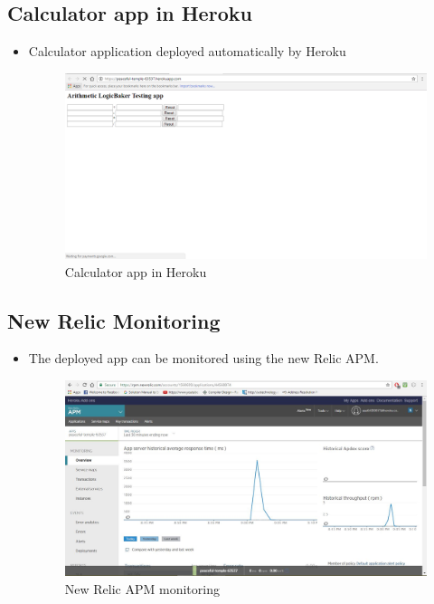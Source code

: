 \documentclass[12pt,a4paper,oneside]{report}
\begin{document}
{\subsection{Calculator app in Heroku}
\begin{itemize}
\item \par Calculator application deployed automatically by Heroku
\begin{figure}[h]
\begin{center}
\includegraphics[scale=.47]{app1.png}
\caption{Calculator app in Heroku}
\label{Calculator app in Heroku}
\end{center}
\end{figure}
\end{itemize}
\newpage
\subsection{New Relic Monitoring}
\begin{itemize}
\item \par The deployed app can be monitored using the new Relic APM.
\begin{figure}[h]
\begin{center}
\includegraphics[scale=.47]{newrelic.png}
\caption{New Relic APM monitoring}
\label{New Relic APM monitoring}
\end{center}
\end{figure}
\end{itemize}
\newpage

}
\end{document}

